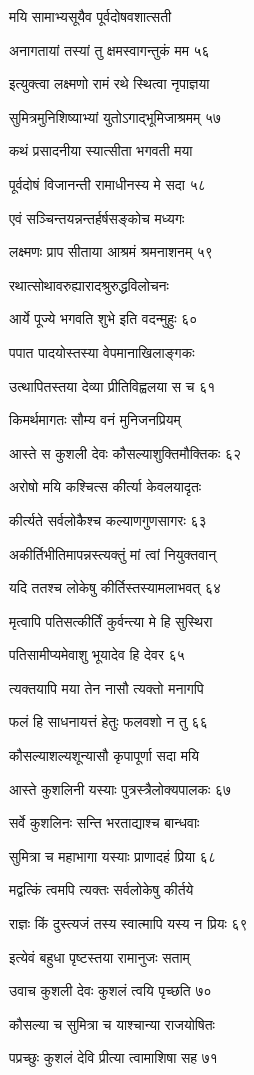 मयि सामाभ्यसूयैव पूर्वदोषवशात्सती

अनागतायां तस्यां तु क्षमस्वागन्तुकं मम ५६

इत्युक्त्वा लक्ष्मणो रामं रथे स्थित्वा नृपाज्ञया

सुमित्रमुनिशिष्याभ्यां युतोऽगाद्भूमिजाश्रमम् ५७

कथं प्रसादनीया स्यात्सीता भगवती मया

पूर्वदोषं विजानन्ती रामाधीनस्य मे सदा ५८

एवं सञ्चिन्तयन्नन्तर्हर्षसङ्कोच मध्यगः

लक्ष्मणः प्राप सीताया आश्रमं श्रमनाशनम् ५९

रथात्सोथावरुह्यारादश्रुरुद्धविलोचनः

आर्ये पूज्ये भगवति शुभे इति वदन्मुहुः ६०

पपात पादयोस्तस्या वेपमानाखिलाङ्गकः

उत्थापितस्तया देव्या प्रीतिविह्वलया स च ६१

किमर्थमागतः सौम्य वनं मुनिजनप्रियम्

आस्ते स कुशली देवः कौसल्याशुक्तिमौक्तिकः ६२

अरोषो मयि कश्चित्स कीर्त्या केवलयादृतः

कीर्त्यते सर्वलोकैश्च कल्याणगुणसागरः ६३

अकीर्तिभीतिमापन्नस्त्यक्तुं मां त्वां नियुक्तवान्

यदि ततश्च लोकेषु कीर्तिस्तस्यामलाभवत् ६४

मृत्वापि पतिसत्कीर्तिं कुर्वन्त्या मे हि सुस्थिरा

पतिसामीप्यमेवाशु भूयादेव हि देवर ६५

त्यक्तयापि मया तेन नासौ त्यक्तो मनागपि

फलं हि साधनायत्तं हेतुः फलवशो न तु ६६

कौसल्याशल्यशून्यासौ कृपापूर्णा सदा मयि

आस्ते कुशलिनी यस्याः पुत्रस्त्रैलोक्यपालकः ६७

सर्वे कुशलिनः सन्ति भरताद्याश्च बान्धवाः

सुमित्रा च महाभागा यस्याः प्राणादहं प्रिया ६८

मद्वत्किं त्वमपि त्यक्तः सर्वलोकेषु कीर्तये

राज्ञः किं दुस्त्यजं तस्य स्वात्मापि यस्य न प्रियः ६९

इत्येवं बहुधा पृष्टस्तया रामानुजः सताम्

उवाच कुशली देवः कुशलं त्वयि पृच्छति ७०

कौसल्या च सुमित्रा च याश्चान्या राजयोषितः

पप्रच्छुः कुशलं देवि प्रीत्या त्वामाशिषा सह ७१

